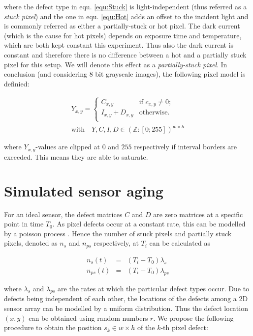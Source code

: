 \documentclass[10pt,twocolumn,letterpaper]{article}
\begin{document}
where the defect type in equ. \ref{equ:Stuck} is light-independent (thus referred as a \emph{stuck pixel}) and the one in equ. \ref{equ:Hot} adds an offset to the incident light and is commonly referred as either a partially-stuck or hot pixel. The dark current (which is the cause for hot pixels) depends on exposure time and temperature, which are both kept constant this experiment. Thus also the dark current is constant and therefore there is no difference between a hot and a partially stuck pixel for this setup. We will denote this effect as a \emph{partially-stuck pixel}. In conclusion (and considering 8 bit grayscale images), the following pixel model is definied:

\begin{equation}
\begin{aligned}
Y_{x,y} = \begin{cases}
C_{x,y}  & \text{if $c_{x,y} \neq 0$}; \\
I_{x,y} +D_{x,y}  & \text{otherwise}.\\
\end{cases} \\ \text{with} \quad Y,C,I,D \in {(\mathbb{Z}:[0;255])}^{w \times h}
\label{equ:finalPixelModel}
\end{aligned} 
\end{equation}

where $Y_{x,y}$-values are clipped at $0$ and $255$ respectively if interval borders are exceeded. This means they are able to saturate. 

\section{Simulated sensor aging}
\label{virtualAging}
For an ideal sensor, the defect matrices $C$ and $D$ are zero matrices at a specific point in time $T_0$. As pixel defects occur at a constant rate, this can be modelled by a poisson process \cite{fridrich}. Hence the number of stuck pixels and partially stuck pixels, denoted as $n_{s}$ and $n_{ps}$ respectively, at $T_i$ can be calculated as

\begin{eqnarray}
   n_s(t)  & = & (T_i-T_0) \lambda_s \\
  n_{ps}(t) & = &  (T_i-T_0) \lambda_{ps}
\end{eqnarray}

where $\lambda_s$ and $\lambda_{ps}$ are the rates at which the particular defect types occur. Due to defects being independent of each other, the locations of the defects among a 2D sensor array can be modelled by a uniform distribution. Thus the defect location $(x,y)$ can be obtained using random numbers $r$. We propose the following procedure to obtain the position $s_k \in {w \times h}$ of the $k$-th pixel defect:
\end{document}
